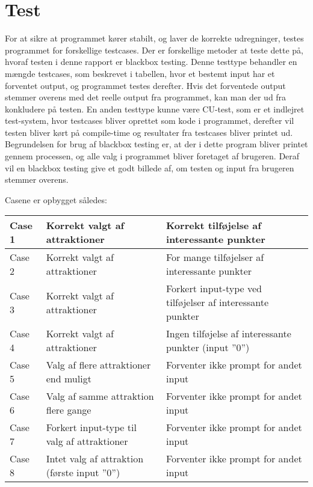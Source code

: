 \chapter{Test}
For at sikre at programmet kører stabilt, og laver de korrekte udregninger, testes programmet for forskellige testcases. Der er forskellige metoder at teste dette på, hvoraf testen i denne rapport er blackbox testing. Denne testtype behandler en mængde testcases, som beskrevet i tabellen, hvor et bestemt input har et forventet output, og programmet testes derefter. Hvis det forventede output stemmer overens med det reelle output fra programmet, kan man der ud fra konkludere på testen.
En anden testtype kunne være CU-test, som er et indlejret test-system, hvor testcases bliver oprettet som kode i programmet, derefter vil testen bliver kørt på compile-time og resultater fra testcases bliver printet ud. Begrundelsen for brug af blackbox testing er, at der i dette program bliver printet gennem processen, og alle valg i programmet bliver foretaget af brugeren. Deraf vil en blackbox testing give et godt billede af, om testen og input fra brugeren stemmer overens.

Casene er opbygget således:\newline
\begin{tabular}{|l|l| p{5cm}|}
\hline
Case 1 & Korrekt valgt af attraktioner & Korrekt tilføjelse af interessante punkter \\ \hline
Case 2 & Korrekt valgt af attraktioner & For mange tilføjelser af interessante punkter \\ \hline
Case 3 & Korrekt valgt af attraktioner & Forkert input-type ved tilføjelser af interessante punkter\\ \hline
Case 4 & Korrekt valgt af attraktioner & Ingen tilføjelse af interessante punkter (input ”0”) \\ \hline
Case 5 & Valg af flere attraktioner end muligt & Forventer ikke prompt for andet input\\ \hline
Case 6 & Valg af samme attraktion flere gange &	Forventer ikke prompt for andet input\\ \hline
Case 7 & Forkert input-type til valg af attraktioner & Forventer ikke prompt for andet input\\ \hline
Case 8 & Intet valg af attraktion (første input ”0”) & Forventer ikke prompt for andet input\\ \hline
\end{tabular} 
\newline

